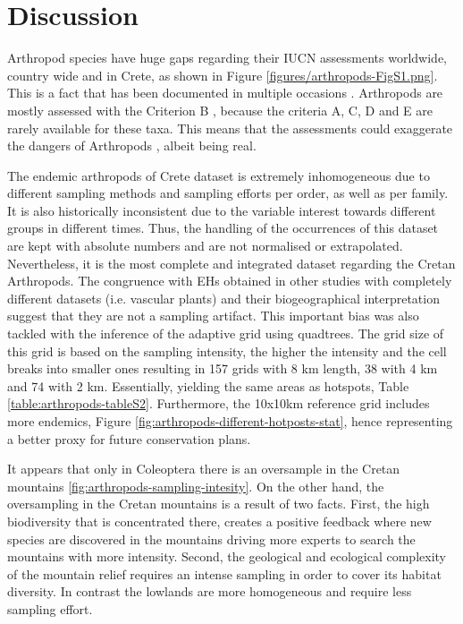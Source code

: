 \section{Discussion}
\label{sec:arthropods-discussion}

Arthropod species have huge gaps regarding their IUCN assessments worldwide,
country wide and in Crete, as shown in Figure \ref{figures/arthropods-FigS1.png}. 
This is a fact that has been documented in multiple occasions \parencite{chowdhury2023protected}. 
Arthropods are mostly assessed with the Criterion B \parencite{cardoso2011adapting,carpaneto2015a-red-list},
because the criteria A, C, D and E are rarely available for these taxa.
This means that the assessments could exaggerate the dangers of Arthropods \parencite{cardoso2011adapting},
albeit being real. 

The endemic arthropods of Crete dataset is extremely inhomogeneous due to
different sampling methods and sampling efforts per order, as well as per family.
It is also historically inconsistent due to the variable interest towards
different groups in different times.
Thus, the handling of the occurrences of this dataset are kept with absolute numbers 
and are not normalised or extrapolated. 
Nevertheless, it is the most complete and integrated dataset regarding the Cretan Arthropods.
The congruence with EHs obtained in other studies with completely different
datasets (i.e. vascular plants) \parencite{kougioumoutzis2020plant} and their biogeographical interpretation suggest
that they are not a sampling artifact. 
This important bias was also tackled with the inference of the adaptive grid using quadtrees.
The grid size of this grid is based on the sampling intensity, the higher the
intensity and the cell breaks into smaller ones resulting in 157 grids with
8 km length, 38 with 4 km and 74 with 2 km. Essentially, yielding the same areas 
as hotspots, Table \ref{table:arthropods-tableS2}. Furthermore, the 10x10km reference 
grid includes more endemics, Figure \ref{fig:arthropods-different-hotposts-stat},
hence representing a better proxy for future conservation plans.

It appears that only in Coleoptera there is an oversample in the Cretan mountains \ref{fig:arthropods-sampling-intesity}.
On the other hand, the oversampling in the Cretan mountains is a result of two facts.
First, the high biodiversity that is concentrated there, creates a positive
feedback where new species are discovered in the mountains driving more experts
to search the mountains with more intensity.
Second, the geological and ecological
complexity of the mountain relief requires an intense sampling in order to
cover its habitat diversity. In contrast the lowlands are more homogeneous and require less sampling effort.


